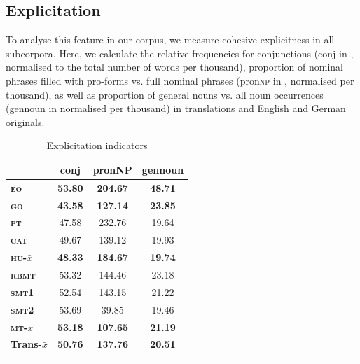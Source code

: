 \documentclass[output=paper]{LSP/langsci}
\begin{document}
\subsection{Explicitation}

To analyse this feature in our corpus, we measure cohesive explicitness in all subcorpora. Here, we calculate the relative frequencies for conjunctions (conj in , normalised to the total number of words per thousand), proportion of nominal phrases filled with pro-forms vs. full nominal phrases (pron\textsc{np} in , normalised per thousand), as well as proportion of general nouns vs. all noun occurrences (gennoun in  normalised per thousand) in translations and English and German originals.

\begin{table}
     \centering
     \begin{tabular}{lccc}
\lsptoprule
              & \textbf{conj}         & \textbf{pronNP}  & \textbf{gennoun} \\ \midrule
\textbf{\textsc{eo}}    & \textbf{53.80}     & \textbf{204.67} & \textbf{48.71} \\ 
\textbf{\textsc{go}}    & \textbf{43.58}     & \textbf{127.14} & \textbf{23.85} \\ 
\textbf{\textsc{pt}}    & 47.58		        & 232.76          & 19.64 \\
\textbf{\textsc{cat}}   & 49.67		        & 139.12          & 19.93  \\ 
\textbf{\textsc{hu}-$\bar{x}$}    & \textbf{48.33}     & \textbf{184.67}   & \textbf{19.74}\\ 
\textbf{\textsc{rbmt}}  & 53.32		        & 144.46          & 23.18 \\
\textbf{\textsc{smt}1}  & 52.54		        & 143.15          & 21.22 \\
\textbf{\textsc{smt}2}  & 53.69		        & 39.85           & 19.46 \\ 
\textbf{\textsc{mt}-$\bar{x}$} & \textbf{53.18}  & \textbf{107.65}  & \textbf{21.19} \\ 
\textbf{Trans-$\bar{x}$} & \textbf{50.76}  & \textbf{137.76}  & \textbf{20.51} \\ 
\lspbottomrule
     \end{tabular}

 \caption{Explicitation indicators}
     \label{tab:4.3}
\end{table}
\end{document}
